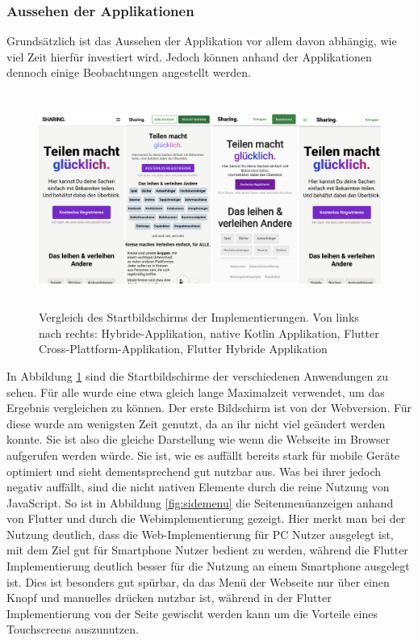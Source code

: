 \subsubsection{Aussehen der Applikationen}
Grundsätzlich ist das Aussehen der Applikation vor allem davon abhängig, wie viel Zeit hierfür investiert wird. Jedoch können anhand der Applikationen dennoch einige Beobachtungen angestellt werden.

\begin{figure}[ht]
  \centering
  \includegraphics[height=7cm,keepaspectratio]{images/Startbildschirm_vergleich.png} 
  \caption[Vergleich des Startbildschirms der Implementierungen]{Vergleich des Startbildschirms der Implementierungen. Von links nach rechts: Hybride-Applikation, native Kotlin Applikation, Flutter Cross-Plattform-Applikation, Flutter Hybride Applikation}
  \label{fig:startscreen}
\end{figure}

In Abbildung \ref{fig:startscreen} sind die Startbildschirme der verschiedenen Anwendungen zu sehen. Für alle wurde eine etwa gleich lange Maximalzeit verwendet, um das Ergebnis vergleichen zu können. Der erste Bildschirm ist von der Webversion. Für diese wurde am wenigsten Zeit genutzt, da an ihr nicht viel geändert werden konnte. Sie ist also die gleiche Darstellung wie wenn die Webseite im Browser aufgerufen werden würde.  Sie ist, wie es auffällt bereits stark für mobile Geräte optimiert und sieht dementsprechend gut nutzbar aus. Was bei ihrer jedoch negativ auffällt, sind die nicht nativen Elemente durch die reine Nutzung von JavaScript.
So ist in Abbildung \ref{fig:sidemenu} die Seitenmenüanzeigen anhand von Flutter und durch die Webimplementierung gezeigt. Hier merkt man bei der Nutzung deutlich, dass die Web-Implementierung für PC Nutzer ausgelegt ist, mit dem Ziel gut für Smartphone Nutzer bedient zu werden, während die Flutter Implementierung deutlich besser für die Nutzung an einem Smartphone ausgelegt ist. Dies ist besonders gut spürbar, da das Menü der Webseite nur über einen Knopf und manuelles drücken nutzbar ist, während in der Flutter Implementierung von der Seite gewischt werden kann um die Vorteile eines Touchscreens auszunutzen.

